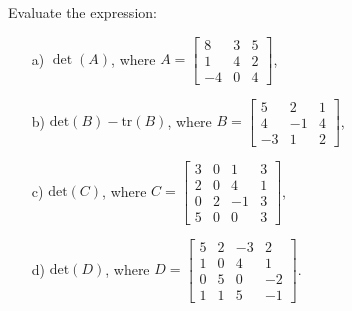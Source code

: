 \begin{problem}[2 points]
    Evaluate the expression:

    \begin{enumerate}
        \item[a) ] $\det(A)$, where $A=\begin{bmatrix}
        8&3&5\\1&4&2\\-4&0&4   \end{bmatrix}$,

        \item[b) ] $\text{det}(B)-\text{tr}(B)$, where $B=\begin{bmatrix}
        5&2&1\\4&-1&4\\-3&1&2 \end{bmatrix}$,
        
        \item[c) ] $\text{det}(C)$, where $C=\begin{bmatrix}
        3&0&1&3\\2&0&4&1\\0&2&-1&3\\5&0&0&3   \end{bmatrix}$,
        
        \item[d) ] $\text{det}(D)$, where $D=\begin{bmatrix}
        5&2&-3&2\\1&0&4&1\\0&5&0&-2\\1&1&5&-1  \end{bmatrix}$.
    \end{enumerate}
\end{problem}



    

        
